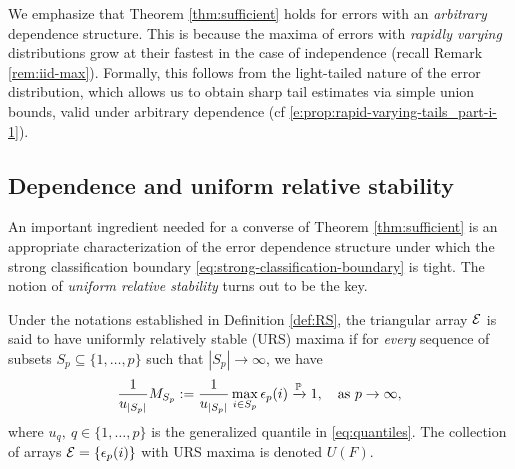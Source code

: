 \begin{remark}
We emphasize that Theorem \ref{thm:sufficient} holds for errors with an \emph{arbitrary} dependence structure. 
This is because the maxima of errors with {\em rapidly varying} distributions grow at their fastest in the case of 
independence (recall Remark \ref{rem:iid-max}).  Formally, this follows from the light-tailed nature of the error 
distribution, which allows us to obtain sharp tail estimates via simple union bounds, valid under arbitrary 
dependence (cf \eqref{e:prop:rapid-varying-tails_part-i-1}).
\end{remark}


\subsection{Dependence and uniform relative stability}
\label{subsec:URS}

An important ingredient needed for a converse of Theorem \ref{thm:sufficient} is an appropriate characterization of the error dependence structure under which the strong classification boundary \eqref{eq:strong-classification-boundary} is tight.
The notion of \emph{uniform relative stability} turns out to be the key.

\begin{definition} \label{def:URS}
Under the notations established in Definition \ref{def:RS}, the triangular array ${\cal E}$ is said to have uniformly relatively stable (URS) maxima if for \emph{every} sequence of subsets $S_p\subseteq\{1,\ldots,p\}$ such that $|S_p| \to \infty$, 
we have
\begin{equation} \label{eq:URS-condition}
    \frac{1}{u_{|S_p|}} M_{S_p} := \frac{1}{u_{|S_p|}} \max_{i\in S_p} \epsilon_p(i) \xrightarrow{\P} 1,\ \ \mbox{ as }p\to\infty,
\end{equation}
where $u_q,\ q\in \{1,\ldots,p\}$ is the generalized quantile in \eqref{eq:quantiles}.
The collection of arrays ${\cal E} = \{ \epsilon_p(i) \}$ with URS maxima is 
denoted $U(F)$.
\end{definition}

